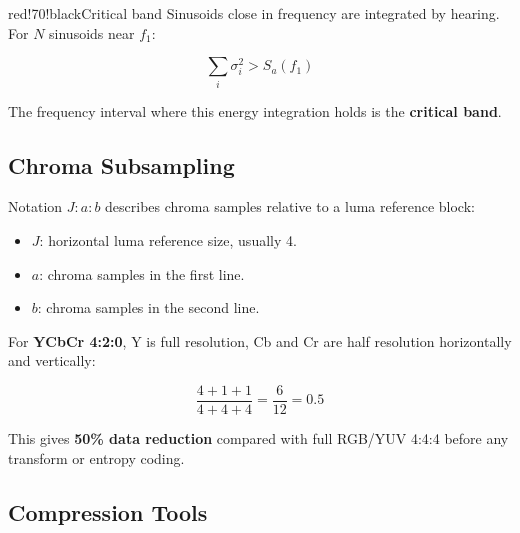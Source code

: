 \begin{calloutbox}{red!70!black}{Critical band}
Sinusoids close in frequency are integrated by hearing. For $N$ sinusoids near $f_1$:

\[
\sum_i \sigma_i^2 > S_a(f_1)
\]

The frequency interval where this energy integration holds is the \textbf{critical band}.
\end{calloutbox}

\subsection{Chroma Subsampling}

Notation $J:a:b$ describes chroma samples relative to a luma reference block:

\begin{itemize}
  \item $J$: horizontal luma reference size, usually 4.
  \item $a$: chroma samples in the first line.
  \item $b$: chroma samples in the second line.
\end{itemize}

\begin{center}
\end{center}

For \textbf{YCbCr 4:2:0}, Y is full resolution, Cb and Cr are half resolution horizontally and vertically:

\[
\frac{4+1+1}{4+4+4}=\frac{6}{12}=0.5
\]

This gives \textbf{50\% data reduction} compared with full RGB/YUV 4:4:4 before any transform or entropy coding.

\subsection{Compression Tools}

